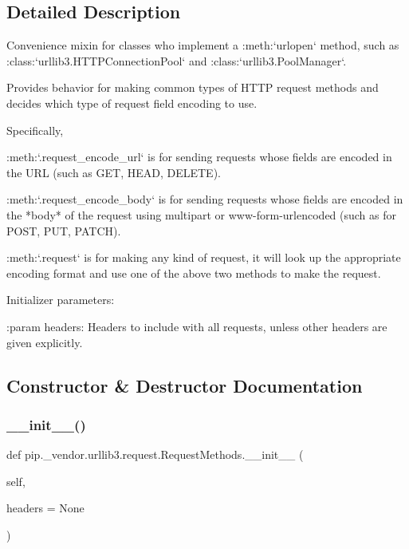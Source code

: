 \subsection{Detailed Description}
\begin{DoxyVerb}Convenience mixin for classes who implement a :meth:`urlopen` method, such
as :class:`urllib3.HTTPConnectionPool` and
:class:`urllib3.PoolManager`.

Provides behavior for making common types of HTTP request methods and
decides which type of request field encoding to use.

Specifically,

:meth:`.request_encode_url` is for sending requests whose fields are
encoded in the URL (such as GET, HEAD, DELETE).

:meth:`.request_encode_body` is for sending requests whose fields are
encoded in the *body* of the request using multipart or www-form-urlencoded
(such as for POST, PUT, PATCH).

:meth:`.request` is for making any kind of request, it will look up the
appropriate encoding format and use one of the above two methods to make
the request.

Initializer parameters:

:param headers:
    Headers to include with all requests, unless other headers are given
    explicitly.
\end{DoxyVerb}
 

\subsection{Constructor \& Destructor Documentation}
\mbox{\label{classpip_1_1__vendor_1_1urllib3_1_1request_1_1RequestMethods_aad45fc268dec425428d10258a6ae0961}} 
\subsubsection{\texorpdfstring{\+\_\+\+\_\+init\+\_\+\+\_\+()}{\_\_init\_\_()}}
{\footnotesize\ttfamily def pip.\+\_\+vendor.\+urllib3.\+request.\+Request\+Methods.\+\_\+\+\_\+init\+\_\+\+\_\+ (\begin{DoxyParamCaption}\item[{}]{self,  }\item[{}]{headers = {\ttfamily None} }\end{DoxyParamCaption})}



